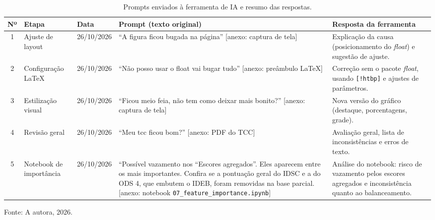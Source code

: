 \begin{table}[htbp]
	\centering
	\footnotesize
	\begin{tabularx}{\textwidth}{c p{2.2cm} p{1.6cm} X X}
		\toprule
		\textbf{Nº} & \textbf{Etapa} & \textbf{Data} & \textbf{Prompt (texto original)} & \textbf{Resposta da ferramenta} \\
		\midrule
		1 & Ajuste de layout & 26/10/2026 & ``A figura ficou bugada na página'' [anexo: captura de tela] & Explicação da causa (posicionamento do \textit{float}) e sugestão de ajuste. \\
		\midrule
		2 & Configuração LaTeX & 26/10/2026 & ``Não posso usar o float vai bugar tudo'' [anexo: preâmbulo LaTeX] & Correção sem o pacote \textit{float}, usando \texttt{[!htbp]} e ajustes de parâmetros. \\
		\midrule
		3 & Estilização visual & 26/10/2026 & ``Ficou meio feia, não tem como deixar mais bonito?'' [anexo: captura de tela] & Nova versão do gráfico (destaque, porcentagens, grade). \\
		\midrule
		4 & Revisão geral & 26/10/2026 & ``Meu tcc ficou bom?'' [anexo: PDF do TCC] & Avaliação geral, lista de inconsistências e erros de texto. \\
		\midrule
		5 & Notebook de importância & 26/10/2026 & ``Possível vazamento nos ``Escores agregados''. Eles aparecem entre os mais importantes. Confira se a pontuação geral do IDSC e a do ODS 4, que embutem o IDEB, foram removidas na base parcial. [anexo: notebook \texttt{07\_feature\_importance.ipynb}] & Análise do notebook: risco de vazamento pelos escores agregados e inconsistência quanto ao balanceamento. \\
		\bottomrule
	\end{tabularx}
	\caption{Prompts enviados à ferramenta de IA e resumo das respostas.}
	\vspace{4pt}
	{\footnotesize \centering Fonte: A autora, 2026.\par}
\end{table}